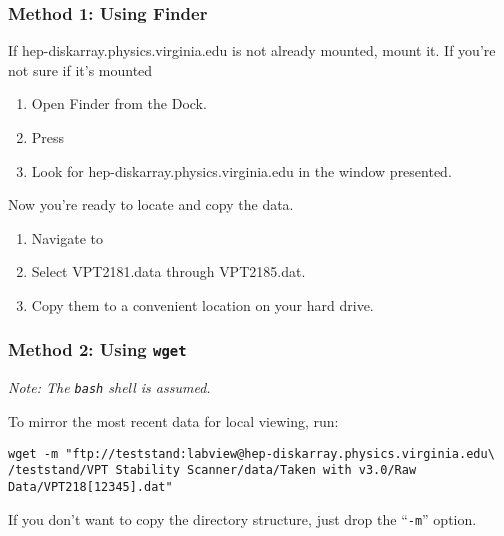 \subsubsection{Method 1: Using Finder}
\label{sec:op_start:data:finder}

If \textsf{hep-diskarray.physics.virginia.edu} is not already mounted, mount it.  If you're not sure if it's mounted
\begin{enumerate}
\item Open \textsf{Finder} from the Dock.
\item Press 
\item Look for \textsf{hep-diskarray.physics.virginia.edu} in the window presented.
\end{enumerate}

Now you're ready to locate and copy the data.
\begin{enumerate}
\item Navigate to 
\item Select \textsf{VPT2181.data} through \textsf{VPT2185.dat}.
\item Copy them to a convenient location on your hard drive.
\end{enumerate}


\subsubsection{Method 2: Using \texttt{wget}}
\label{sec:op_start:data:wget}
\textit{Note: The \texttt{bash} shell is assumed.}

To mirror the most recent data for local viewing, run:
\begin{verbatim}
wget -m "ftp://teststand:labview@hep-diskarray.physics.virginia.edu\
/teststand/VPT Stability Scanner/data/Taken with v3.0/Raw Data/VPT218[12345].dat"
\end{verbatim}

If you don't want to copy the directory structure, just drop the ``\texttt{-m}'' option.
